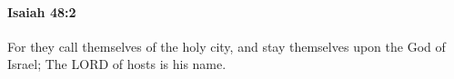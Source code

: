 
		\paragraph{Isaiah 48:2} %
			\label{ISAIAH-48-2}

			For they call themselves of the holy city, and stay themselves upon the God of Israel; The LORD of hosts is his name.


